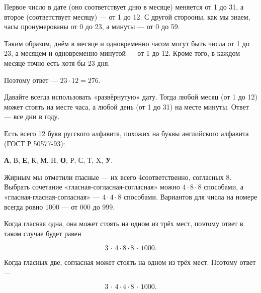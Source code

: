 \begin{itemize}
\itA Первое число в дате (оно соответствует дню в месяце) меняется от 1 до 31, а второе (соответствует месяцу) — от 1 до 12. С другой сторооны, как мы знаем, часы пронумерованы от 0 до 23, а минуты — от 0 до 59.

\ms Таким образом, днём в месяце и одновременно часом могут быть числа от 1 до 23, а месяцем и одновременно минутой — от 1 до 12. Кроме того, в каждом месяце точно есть хотя бы 23 дня.

\ms Поэтому ответ — $23 \cdot 12 = 276$.

\itB Давайте всегда использовать «развёрнутую» дату. Тогда любой месяц (от 1 до 12) может стоять на месте часа, а любой день (от 1 до 31) на месте минуты. Ответ — все дни в году.

\itC Есть всего 12 букв русского алфавита, похожих на буквы английского алфавита (\href{http://base.garant.ru/12142212}{ГОСТ Р 50577-93}): \medskip

\centerline{{\bfseries А}, В, {\bfseries Е}, К, М, Н, {\bfseries О}, Р, С, Т, X, {\bfseries У}.}

\ms Жирным мы отметили гласные — их всего 4\scolon соответственно, согласных 8. Выбрать сочетание «гласная-согласная-согласная» можно $4 \cdot 8 \cdot 8$ способами, а «гласная-гласная-согласная» — $4 \cdot 4 \cdot 8$ способами. Вариантов для числа на номере всегда ровно 1000 — от 000 до 999.

\ms Когда гласная одна, она может стоять на одном из трёх мест, поэтому ответ в таком случае будет равен

$$3\,\cdot\,4\cdot8\cdot8\,\cdot\,1000.$$

\ms Когда гласных две, согласная может стоять на одном из трёх мест. Поэтому ответ —

$$3\,\cdot\,4\cdot4\cdot8\,\cdot\,1000.$$
\end{itemize}